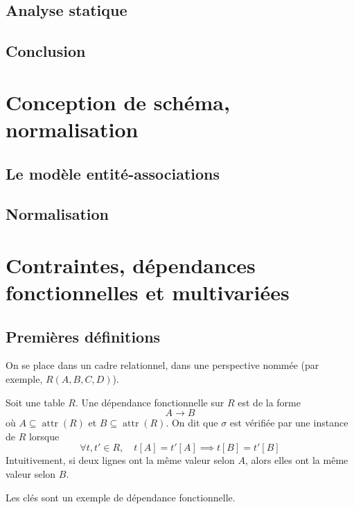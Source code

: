 \documentclass[french, toc]{../cs-classes/cs-classes}
\DeclareMathOperator{\attr}{attr}
\begin{document}
\subsection{Analyse statique}

\subsection*{Conclusion}

\section{Conception de schéma, normalisation}
\subsection{Le modèle entité-associations}

\subsection{Normalisation}

\section{Contraintes, dépendances fonctionnelles et multivariées}
\subsection{Premières définitions}
On se place dans un cadre relationnel, dans une perspective nommée (par exemple, $R(A, B, C, D)$).

\begin{definition}
    Soit une table $R$. Une dépendance fonctionnelle sur $R$ est de la forme
    \begin{equation*}
        A \to B
    \end{equation*}
    où $A\subseteq \attr(R)$ et $B\subseteq \attr(R)$. On dit que $\sigma$ est vérifiée par une instance de $R$ lorsque
    \begin{equation*}
        \forall t, t'\in R, \quad t[A]=t'[A]\implies t[B]=t'[B]
    \end{equation*}
    Intuitivement, si deux lignes ont la même valeur selon $A$, alors elles ont la même valeur selon $B$. 
\end{definition}

\begin{remarque}
    Les clés sont un exemple de dépendance fonctionnelle.
\end{remarque}
\end{document}
